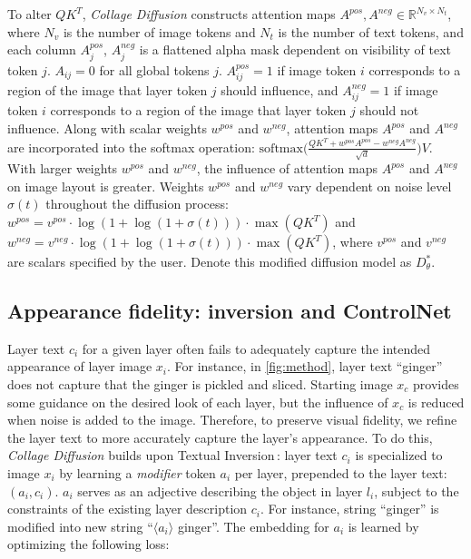To alter $QK^T$, \textit{Collage Diffusion} constructs attention maps $A^{pos}, A^{neg} \in \mathbb{R}^{N_v \times N_t}$, where $N_v$ is the number of image tokens and $N_t$ is the number of text tokens, and each column $A^{pos}_j$, $A^{neg}_j$ is a flattened alpha mask dependent on visibility of text token $j$. $A_{ij} = 0$ for all global tokens $j$. $A^{pos}_{ij} = 1$ if image token $i$ corresponds to a region of the image that layer token $j$ should influence, and $A^{neg}_{ij} = 1$ if image token $i$ corresponds to a region of the image that layer token $j$ should not influence. 
Along with scalar weights $w^{pos}$ and $w^{neg}$, attention maps $A^{pos}$ and $A^{neg}$ are incorporated into the softmax operation: $\mathrm{softmax}\big(\frac{QK^T + w^{pos}A^{pos} - w^{neg}A^{neg}}{\sqrt{d}}\big)V$. 
With larger weights $w^{pos}$ and $w^{neg}$, the influence of attention maps $A^{pos}$ and $A^{neg}$ on image layout is greater.
Weights $w^{pos}$ and $w^{neg}$ vary dependent on noise level $\sigma(t)$ throughout the diffusion process: $w^{pos} = v^{pos} \cdot \log(1 + \log(1 + \sigma(t))) \cdot \max(QK^T)$ and $w^{neg} = v^{neg} \cdot \log(1 + \log(1 + \sigma(t))) \cdot \max(QK^T)$, where $v^{pos}$ and $v^{neg}$ are scalars specified by the user. 
Denote this modified diffusion model as $D^*_\theta$.

\subsection{Appearance fidelity: inversion and ControlNet} \label{method:TI}
\vspace{-0.5em}

Layer text $c_i$ for a given layer often fails to adequately capture the intended appearance of layer image $x_i$.
For instance, in \cref{fig:method}, layer text ``ginger'' does not capture that the ginger is pickled and sliced. 
Starting image $x_c$ provides some guidance on the desired look of each layer, but the influence of $x_c$ is reduced when noise is added to the image. 
Therefore, to preserve visual fidelity, we refine the layer text to more accurately capture the layer's appearance. To do this, \textit{Collage Diffusion} builds upon Textual Inversion\,\cite{TextualInversion}:
layer text $c_i$ is specialized to image $x_i$ by learning a \textit{modifier} token $a_i$ per layer, prepended to the layer text: $(a_i,c_i)$. 
$a_i$ serves as an adjective describing the object in layer $l_i$, subject to the constraints of the existing layer description $c_i$. 
For instance, string ``ginger'' is modified into new string ``$\langle a_i \rangle$ ginger''. 
The embedding for $a_i$ is learned by optimizing the following loss:

